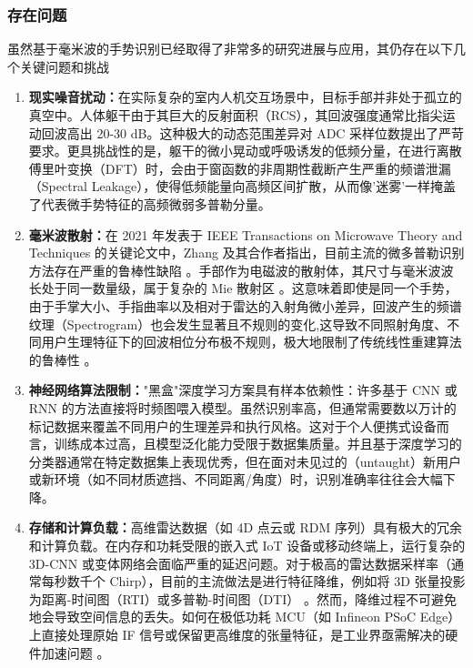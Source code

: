 \subsubsection{存在问题}

虽然基于毫米波的手势识别已经取得了非常多的研究进展与应用，其仍存在以下几个关键问题和挑战

\begin{enumerate}
    \item \textbf{现实噪音扰动：}在实际复杂的室内人机交互场景中，目标手部并非处于孤立的真空中。人体躯干由于其巨大的反射面积（RCS），其回波强度通常比指尖运动回波高出 20-30 dB。这种极大的动态范围差异对 ADC 采样位数提出了严苛要求。更具挑战性的是，躯干的微小晃动或呼吸诱发的低频分量，在进行离散傅里叶变换（DFT）时，会由于窗函数的非周期性截断产生严重的频谱泄漏（Spectral Leakage），使得低频能量向高频区间扩散，从而像'迷雾'一样掩盖了代表微手势特征的高频微弱多普勒分量。
    \item \textbf{毫米波散射：}在 2021 年发表于 IEEE Transactions on Microwave Theory and Techniques 的关键论文中，Zhang 及其合作者指出，目前主流的微多普勒识别方法存在严重的鲁棒性缺陷 。手部作为电磁波的散射体，其尺寸与毫米波波长处于同一数量级，属于复杂的 Mie 散射区 \cite{mainpaper}。这意味着即使是同一个手势，由于手掌大小、手指曲率以及相对于雷达的入射角微小差异，回波产生的频谱纹理（Spectrogram）也会发生显著且不规则的变化,这导致不同照射角度、不同用户生理特征下的回波相位分布极不规则，极大地限制了传统线性重建算法的鲁棒性 。
    \item \textbf{神经网络算法限制：}"黑盒"深度学习方案具有样本依赖性：许多基于 CNN 或 RNN 的方法直接将时频图喂入模型。虽然识别率高，但通常需要数以万计的标记数据来覆盖不同用户的生理差异和执行风格。这对于个人便携式设备而言，训练成本过高，且模型泛化能力受限于数据集质量。并且基于深度学习的分类器通常在特定数据集上表现优秀，但在面对未见过的（untaught）新用户或新环境（如不同材质遮挡、不同距离/角度）时，识别准确率往往会大幅下降。
    \item \textbf{存储和计算负载：}高维雷达数据（如 4D 点云或 RDM 序列）具有极大的冗余和计算负载。在内存和功耗受限的嵌入式 IoT 设备或移动终端上，运行复杂的 3D-CNN 或变体网络会面临严重的延迟问题。对于极高的雷达数据采样率（通常每秒数千个 Chirp），目前的主流做法是进行特征降维，例如将 3D 张量投影为距离-时间图（RTI）或多普勒-时间图（DTI） 。然而，降维过程不可避免地会导致空间信息的丢失。如何在极低功耗 MCU（如 Infineon PSoC Edge）上直接处理原始 IF 信号或保留更高维度的张量特征，是工业界亟需解决的硬件加速问题 。
\end{enumerate}

